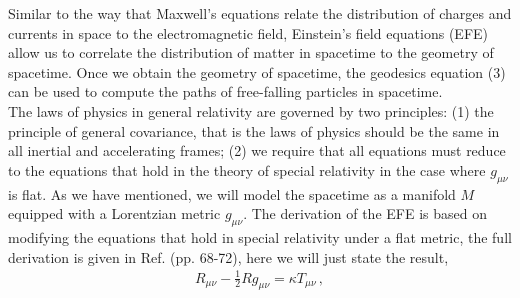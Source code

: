 \documentclass[11pt, onesided]{book}
\theoremstyle{break}
\theoremstyle{break}
\begin{document}
Similar to the way that Maxwell's equations relate the distribution of charges and currents in space to the electromagnetic field, Einstein's field equations (EFE) allow us to correlate the distribution of matter in spacetime to the geometry of spacetime. Once we obtain the geometry of spacetime, the geodesics equation (3) can be used to compute the paths of free-falling particles in spacetime. \\

The laws of physics in general relativity are governed by two principles: (1) the principle of general covariance, that is the laws of physics should be the same in all inertial and accelerating frames; (2) we require that all equations must reduce to the equations that hold in the theory of special relativity in the case where $g_{\mu\nu}$ is flat. As we have mentioned, we will model the spacetime as a manifold $M$ equipped with a Lorentzian metric $g_{\mu\nu}$. The derivation of the EFE is based on modifying the equations that hold in special relativity under a flat metric, the full derivation is given in Ref. \cite{Wald} (pp. 68-72), here we will just state the result,
\begin{align}
R_{\mu\nu}- \frac{1}{2}Rg_{\mu \nu} = \kappa T_{\mu\nu}\,,
\end{align}
\end{document}
